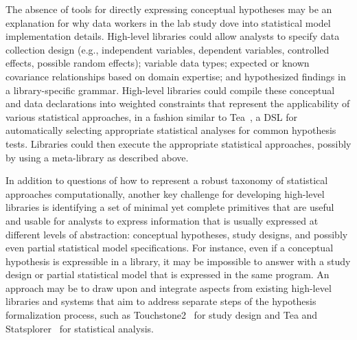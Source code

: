 The absence of tools for directly expressing conceptual hypotheses may be an
explanation for why data workers in the lab study dove into statistical model
implementation details. High-level libraries could allow analysts to specify data
collection design (e.g., independent variables, dependent variables, controlled
effects, possible random effects); variable data types; expected or known
covariance relationships based on domain expertise; and hypothesized findings in
a library-specific grammar. High-level libraries could compile these conceptual
and data declarations into weighted constraints that represent the applicability
of various statistical approaches, in a fashion similar to
Tea~\cite{jun2019tea}, a DSL for automatically selecting
appropriate statistical analyses for common hypothesis tests. Libraries could
then execute the appropriate statistical approaches, possibly by using a
meta-library as described above. 

In addition to questions of how to represent a robust taxonomy of statistical
approaches computationally, another key challenge for developing high-level
libraries is identifying a set of minimal yet complete primitives that are
useful and usable for analysts to express information that is usually expressed
at different levels of abstraction: conceptual hypotheses, study designs, and
possibly even partial statistical model specifications. For instance, even if a
conceptual hypothesis is expressible in a library, it may be impossible to
answer with a study design or partial statistical model that is expressed in the
same program. An approach may be to draw upon and integrate aspects from
existing high-level libraries and systems that aim to address separate steps of
the hypothesis formalization process, such as
Touchstone2~\cite{eiselmayer2019touchstone2} for study design and Tea and
Statsplorer~\cite{wacharamanotham2015statsplorer} for statistical analysis. 



